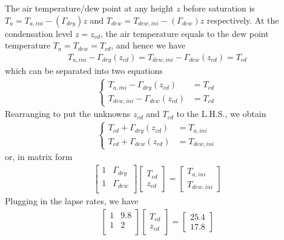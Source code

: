 \begin{Answer}
The air temperature/dew point at any height $z$ before saturation is $T_a = T_{a,ini} - (\Gamma_{dry})z$ and $T_{dew} = T_{dew, ini} - (\Gamma_{dew})z$ respectively. At the condensation level $z = z_{cd}$, the air temperature equals to the dew point temperature $T_a = T_{dew} = T_{cd}$, and hence we have
\begin{align*}
T_{a,ini} - \Gamma_{dry}(z_{cd}) = T_{dew, ini} - \Gamma_{dew}(z_{cd}) = T_{cd}
\end{align*}
which can be separated into two equations
\begin{align*}
\begin{cases}
T_{a,ini} - \Gamma_{dry}(z_{cd}) &= T_{cd} \\
T_{dew, ini} - \Gamma_{dew}(z_{cd}) &= T_{cd}
\end{cases}
\end{align*}
Rearranging to put the unknowns $z_{cd}$ and $T_{cd}$ to the L.H.S., we obtain
\begin{align*}
\begin{cases}
T_{cd} + \Gamma_{dry}(z_{cd}) &= T_{a,ini}\\
T_{cd} + \Gamma_{dew}(z_{cd}) &= T_{dew, ini} 
\end{cases}
\end{align*}
or, in matrix form
\begin{align*}
\begin{bmatrix}
1 & \Gamma_{dry} \\
1 & \Gamma_{dew} \\
\end{bmatrix}
\begin{bmatrix}
T_{cd} \\
z_{cd}
\end{bmatrix}
=
\begin{bmatrix}
T_{a,ini} \\   
T_{dew, ini}
\end{bmatrix}
\end{align*}
Plugging in the lapse rates, we have
\begin{align*}
\begin{bmatrix}
1 & 9.8 \\
1 & 2 \\
\end{bmatrix}
\begin{bmatrix}
T_{cd} \\
z_{cd}
\end{bmatrix}
=
\begin{bmatrix}
25.4 \\   
17.8
\end{bmatrix}
\end{align*}
\end{Answer}

